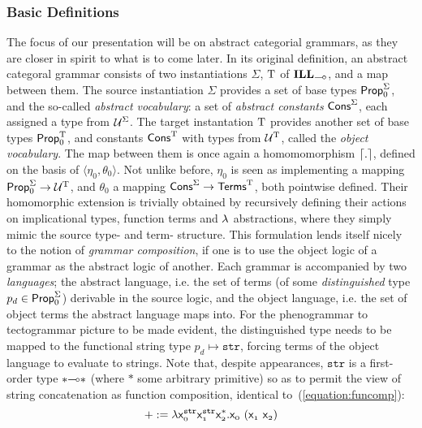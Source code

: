 \subsubsection{Basic Definitions}
The focus of our presentation will be on abstract categorial grammars, as they are closer in spirit to what is to come later.
In its original definition, an abstract categoral grammar consists of two instantiations $\Sigma$, $\mathrm{T}$ of $\ILL_{\li}$, and a map between them.
The source instantiation $\Sigma$ provides a set of base types $\mathsf{Prop}_0^{\Sigma}$, and the so-called \textit{abstract vocabulary}: a set of \textit{abstract constants} $\mathsf{Cons}^{\Sigma}$, each assigned a type from $\mathcal{U}^{\Sigma}$.
The target instantation $\mathrm{T}$ provides another set of base types $\mathsf{Prop}_0^{\mathrm{T}}$, and constants $\mathsf{Cons}^{\mathrm{T}}$ with types from $\mathcal{U}^{\mathrm{T}}$, called the \textit{object vocabulary}.
The map between them is once again a homomomorphism $\lceil{.}\rceil$, defined on the basis of $\langle \eta_0, \theta_0\rangle$.
Not unlike before, $\eta_0$ is seen as implementing a mapping $\mathsf{Prop}_0^{\Sigma} \to \mathcal{U}^{\mathrm{T}}$, and $\theta_0$ a mapping $\mathsf{Cons}^{\Sigma}\to \mathsf{Terms}^{\mathrm{T}}$, both pointwise defined.
Their homomorphic extension is trivially obtained by recursively defining their actions on implicational types, function terms and $\mathnormal{\lambda}$ abstractions, where they simply mimic the source type- and term- structure.
This formulation lends itself nicely to the notion of \textit{grammar composition}, if one is to use the object logic of a grammar as the abstract logic of another.
Each grammar is accompanied by two \textit{languages}; the abstract language, i.e. the set of terms (of some \textit{distinguished} type $p_d\in \mathsf{Prop}_0^{\Sigma}$) derivable in the source logic, and the object language, i.e. the set of object terms the abstract language maps into.
For the phenogrammar to tectogrammar picture to be made evident, the distinguished type needs to be mapped to the functional string type $p_{d} \mapsto \mathtt{str}$, forcing terms of the object language to evaluate to strings.
Note that, despite appearances, $\mathtt{str}$ is a first-order type $*\li *$ (where $*$ some arbitrary primitive) so as to permit the view of string concatenation as function composition, identical to~(\ref{equation:funcomp}):
\begin{equation}
+ := \mathnormal{\lambda} \mathsf{\mathsf{x}_{\mathnormal{0}}^{\mathtt{str}}\mathsf{x}_{\mathnormal{1}}^{\mathtt{str}}\mathsf{x}_{\mathnormal{2}}^{*}.\mathsf{x}_{\mathnormal{0}}~(\mathsf{x}_{\mathnormal{1}}~\mathsf{x}_{\mathnormal{2}})}
\end{equation}


